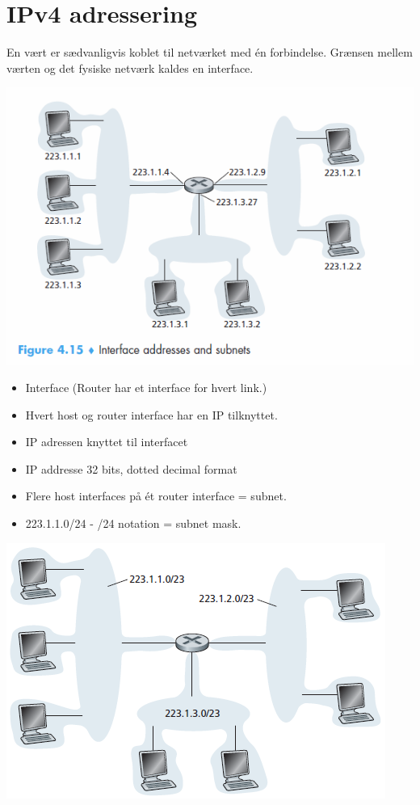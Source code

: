 {{{{{\section{IPv4 adressering}
En vært er sædvanligvis koblet til netværket med én forbindelse. Grænsen mellem værten og det fysiske netværk kaldes en interface.
\begin{center}
  \includegraphics{4-network-layer/ipv4-adressering.png}
\end{center}
\begin{itemize}
	\item Interface (Router har et interface for hvert link.)
 	\item Hvert host og router interface har en IP tilknyttet.
	\item IP adressen knyttet til interfacet
	\item IP addresse 32 bits, dotted decimal format
	\item Flere host interfaces på ét router interface = subnet.
	\item 223.1.1.0/24 - /24 notation = subnet mask.
\end{itemize}

  \includegraphics{4-network-layer/ivpsubnet.png}

}}}}}
